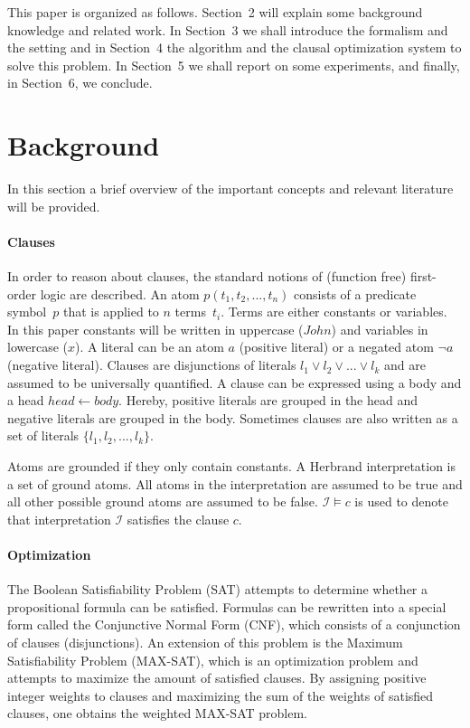 \documentclass[letterpaper]{article}
\newcommand{\sym}[1]{\ensuremath{\mathcal{#1}}}
\theoremstyle{definition}
\begin{document}
This paper is organized as follows.
Section~2 will explain some background knowledge and related work.
In Section~3 we shall introduce the formalism and the setting and in Section~4 the algorithm and the clausal optimization system to solve this problem.
In Section~5 we shall report on some experiments, and finally, in Section~6, we conclude.


\section{Background}
In this section a brief overview of the important concepts and relevant literature will be provided.

\paragraph{Clauses}
In order to reason about clauses, the standard notions of (function free) first-order logic are described.
An atom $p(t_1, t_2, ..., t_n)$ consists of a predicate symbol~$p$ that is applied to $n$ terms~$t_i$.
Terms are either constants or variables.
In this paper constants will be written in uppercase ($\mathit{John}$) and variables in lowercase ($\mathit{x}$).
A literal can be an atom $a$ (positive literal) or a negated atom $\lnot a$ (negative literal).
Clauses are disjunctions of literals $l_1 \lor l_2 \lor ... \lor l_k$ and are assumed to be universally quantified.
A clause can be expressed using a body and a head $\mathit{head} \leftarrow \mathit{body}$.
Hereby, positive literals are grouped in the head and negative literals are grouped in the body.
Sometimes clauses are also written as a set of literals $\{l_1, l_2, ..., l_k\}$.

Atoms are grounded if they only contain constants.
A Herbrand interpretation is a set of ground atoms.
All atoms in the interpretation are assumed to be true and all other possible ground atoms are assumed to be false.
$\sym{I} \models c$ is used to denote that interpretation \sym{I} satisfies the clause $c$.

\paragraph{Optimization}
The Boolean Satisfiability Problem (SAT) attempts to determine whether a propositional formula can be satisfied.
Formulas can be rewritten into a special form called the Conjunctive Normal Form (CNF), which consists of a conjunction of clauses (disjunctions).
An extension of this problem is the Maximum Satisfiability Problem (MAX-SAT), which is an optimization problem and attempts to maximize the amount of satisfied clauses.
By assigning positive integer weights to clauses and maximizing the sum of the weights of satisfied clauses, one obtains the weighted MAX-SAT problem.
\end{document}
